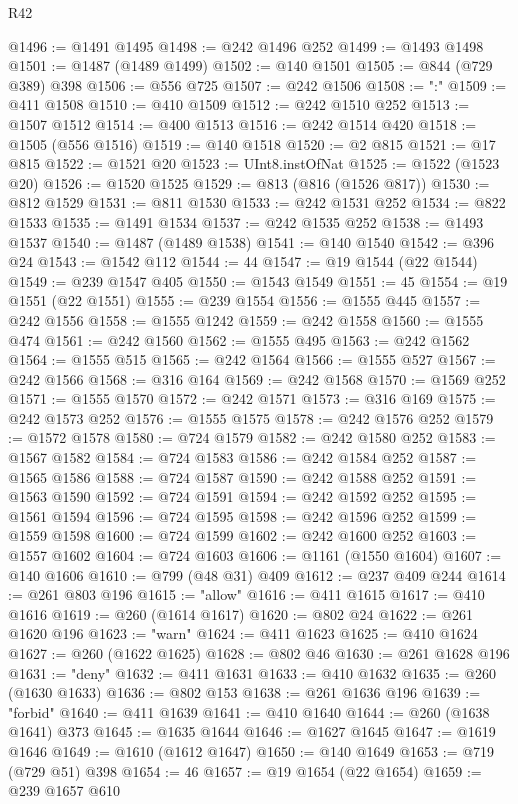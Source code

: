 \begin{lexlean}{R42}
\begin{coremodule}
@1496 := @1491 @1495
@1498 := @242 @1496 @252
@1499 := @1493 @1498
@1501 := @1487 (@1489 @1499)
@1502 := @140 @1501
@1505 := @844 (@729 @389) @398
@1506 := @556 @725
@1507 := @242 @1506
@1508 := ":"
@1509 := @411 @1508
@1510 := @410 @1509
@1512 := @242 @1510 @252
@1513 := @1507 @1512
@1514 := @400 @1513
@1516 := @242 @1514 @420
@1518 := @1505 (@556 @1516)
@1519 := @140 @1518
@1520 := @2 @815
@1521 := @17 @815
@1522 := @1521 @20
@1523 := UInt8.instOfNat
@1525 := @1522 (@1523 @20)
@1526 := @1520 @1525
@1529 := @813 (@816 (@1526 @817))
@1530 := @812 @1529
@1531 := @811 @1530
@1533 := @242 @1531 @252
@1534 := @822 @1533
@1535 := @1491 @1534
@1537 := @242 @1535 @252
@1538 := @1493 @1537
@1540 := @1487 (@1489 @1538)
@1541 := @140 @1540
@1542 := @396 @24
@1543 := @1542 @112
@1544 := 44
@1547 := @19 @1544 (@22 @1544)
@1549 := @239 @1547 @405
@1550 := @1543 @1549
@1551 := 45
@1554 := @19 @1551 (@22 @1551)
@1555 := @239 @1554
@1556 := @1555 @445
@1557 := @242 @1556
@1558 := @1555 @1242
@1559 := @242 @1558
@1560 := @1555 @474
@1561 := @242 @1560
@1562 := @1555 @495
@1563 := @242 @1562
@1564 := @1555 @515
@1565 := @242 @1564
@1566 := @1555 @527
@1567 := @242 @1566
@1568 := @316 @164
@1569 := @242 @1568
@1570 := @1569 @252
@1571 := @1555 @1570
@1572 := @242 @1571
@1573 := @316 @169
@1575 := @242 @1573 @252
@1576 := @1555 @1575
@1578 := @242 @1576 @252
@1579 := @1572 @1578
@1580 := @724 @1579
@1582 := @242 @1580 @252
@1583 := @1567 @1582
@1584 := @724 @1583
@1586 := @242 @1584 @252
@1587 := @1565 @1586
@1588 := @724 @1587
@1590 := @242 @1588 @252
@1591 := @1563 @1590
@1592 := @724 @1591
@1594 := @242 @1592 @252
@1595 := @1561 @1594
@1596 := @724 @1595
@1598 := @242 @1596 @252
@1599 := @1559 @1598
@1600 := @724 @1599
@1602 := @242 @1600 @252
@1603 := @1557 @1602
@1604 := @724 @1603
@1606 := @1161 (@1550 @1604)
@1607 := @140 @1606
@1610 := @799 (@48 @31) @409
@1612 := @237 @409 @244
@1614 := @261 @803 @196
@1615 := "allow"
@1616 := @411 @1615
@1617 := @410 @1616
@1619 := @260 (@1614 @1617)
@1620 := @802 @24
@1622 := @261 @1620 @196
@1623 := "warn"
@1624 := @411 @1623
@1625 := @410 @1624
@1627 := @260 (@1622 @1625)
@1628 := @802 @46
@1630 := @261 @1628 @196
@1631 := "deny"
@1632 := @411 @1631
@1633 := @410 @1632
@1635 := @260 (@1630 @1633)
@1636 := @802 @153
@1638 := @261 @1636 @196
@1639 := "forbid"
@1640 := @411 @1639
@1641 := @410 @1640
@1644 := @260 (@1638 @1641) @373
@1645 := @1635 @1644
@1646 := @1627 @1645
@1647 := @1619 @1646
@1649 := @1610 (@1612 @1647)
@1650 := @140 @1649
@1653 := @719 (@729 @51) @398
@1654 := 46
@1657 := @19 @1654 (@22 @1654)
@1659 := @239 @1657 @610

\end{coremodule}
\end{lexlean}
